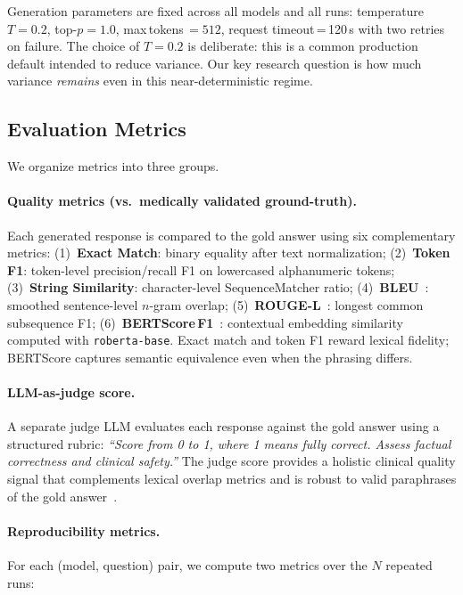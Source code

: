 \documentclass[11pt,twocolumn]{article}
\begin{document}
Generation parameters are fixed across all models and all runs:
temperature $T{=}0.2$, top-$p{=}1.0$, max\,tokens\,$=512$,
request timeout\,=\,120\,s with two retries on failure.
The choice of $T{=}0.2$ is deliberate: this is a common production
default intended to reduce variance.
Our key research question is how much variance \emph{remains} even
in this near-deterministic regime.

\subsection{Evaluation Metrics}
\label{sec:metrics}

We organize metrics into three groups.

\paragraph{Quality metrics (vs.\ medically validated ground-truth).}
Each generated response is compared to the gold answer using six
complementary metrics:
(1)~\textbf{Exact Match}: binary equality after text normalization;
(2)~\textbf{Token F1}: token-level precision/recall F1 on
lowercased alphanumeric tokens;
(3)~\textbf{String Similarity}: character-level SequenceMatcher ratio;
(4)~\textbf{BLEU}~\cite{papineni2002bleu}: smoothed sentence-level
$n$-gram overlap;
(5)~\textbf{ROUGE-L}~\cite{lin2004rouge}: longest common subsequence F1;
(6)~\textbf{BERTScore\,F1}~\cite{zhang2020bertscore}: contextual
embedding similarity computed with \texttt{roberta-base}.
Exact match and token F1 reward lexical fidelity;
BERTScore captures semantic equivalence even when the phrasing differs.

\paragraph{LLM-as-judge score.}
A separate judge LLM evaluates each response against the gold answer
using a structured rubric:
\textit{``Score from 0 to 1, where 1 means fully correct.
Assess factual correctness and clinical safety.''}
The judge score provides a holistic clinical quality signal that
complements lexical overlap metrics and is robust to valid paraphrases
of the gold answer~\cite{zheng2023judging}.

\paragraph{Reproducibility metrics.}
For each (model, question) pair, we compute two metrics over the
$N$ repeated runs:
\end{document}
